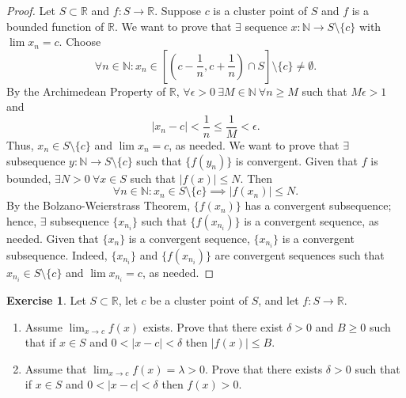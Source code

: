 \documentclass[12pt]{article}
\theoremstyle{definition}
\newtheorem{exercise}{Exercise}
\begin{document}
\begin{proof}
    Let \(S \subset \mathbb{R}\) and \(f : S \to \mathbb{R}\). Suppose \(c\) is a cluster point of \(S\) and \(f\) is a bounded function of \(\mathbb{R}\). We want to prove that \(\exists\) sequence \(x : \mathbb{N} \to S \setminus \{c\}\) with \(\lim x_n = c\). Choose
    \[
        \forall n \in \mathbb{N} : x_n \in \left[\left(c - \frac{1}{n}, c + \frac{1}{n}\right) \cap S\right] \setminus \{c\} \neq \emptyset.
    \]
    By the Archimedean Property of \(\mathbb{R}\), \(\forall \epsilon > 0 \ \exists M \in \mathbb{N} \ \forall n \geq M\) such that \(M\epsilon > 1\) and
    \[
        \vert x_n - c \vert < \frac{1}{n} \leq \frac{1}{M} < \epsilon.
    \]
    Thus, \(x_n \in S \setminus \{c\}\) and \(\lim x_n = c\), as needed. We want to prove that \(\exists \) subsequence \(y : \mathbb{N} \to S \setminus \{c\}\) such that \(\{f(y_n)\}\) is convergent. Given that \(f\) is bounded, \(\exists N > 0 \ \forall x \in S\) such that \(\vert f(x) \vert \leq N\). Then
    \[
        \forall n \in \mathbb{N} : x_n \in S \setminus \{c\} \implies \vert f(x_n) \vert \leq N.
    \]
    By the Bolzano-Weierstrass Theorem, \(\{f(x_n)\}\) has a convergent subsequence; hence, \(\exists\) subsequence \(\{x_{n_i}\}\) such that \(\{f(x_{n_i})\}\) is a convergent sequence, as needed. Given that \(\{x_n\}\) is a convergent sequence, \(\{x_{n_i}\}\) is a convergent subsequence. Indeed, \(\{x_{n_i}\}\) and \(\{f(x_{n_i})\}\) are convergent sequences such that \(x_{n_i} \in S \setminus \{c\}\) and \(\lim x_{n_i} = c\), as needed.
\end{proof}

\begin{exercise}
    Let \(S \subset \mathbb{R}\), let \(c\) be a cluster point of \(S\), and let \(f : S \to \mathbb{R}\).
    \begin{enumerate}[label=(\alph*)]
        \item Assume \(\lim_{x \to c}f(x)\) exists. Prove that there exist \(\delta > 0\) and \(B \geq 0\) such that if \(x \in S\) and \(0 < \vert x - c \vert < \delta\) then \(\vert f(x) \vert \leq B\).
        \item Assume that \(\lim_{x \to c}f(x) = \lambda  > 0\). Prove that there exists \(\delta > 0\) such that if \(x \in S\) and \(0 < \vert x - c \vert < \delta\) then \(f(x) > 0\).
    \end{enumerate}
\end{exercise}
\end{document}
